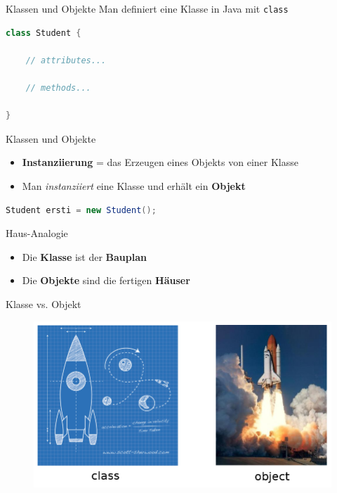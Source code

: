 \documentclass[18pt]{beamer}
\begin{document}
\begin{frame}[fragile]{Klassen und Objekte}
    Man definiert eine Klasse in Java mit \texttt{class}
    \begin{exampleblock}{}
        \begin{lstlisting}[language=Java]
class Student {

    // attributes...

    // methods...

}
        \end{lstlisting}
    \end{exampleblock}
\end{frame}

\begin{frame}[fragile]{Klassen und Objekte}
    \begin{itemize}
        \item \textbf{Instanziierung} = das Erzeugen eines Objekts von einer Klasse
        \item Man \textit{instanziiert} eine Klasse und erhält ein \textbf{Objekt}
    \end{itemize}

    \begin{exampleblock}{}
        \begin{lstlisting}[language=Java]
Student ersti = new Student();
        \end{lstlisting}
    \end{exampleblock}
\end{frame}

\begin{frame}{Haus-Analogie}
    \begin{itemize}
        \item Die \textbf{Klasse} ist der \textbf{Bauplan}
        \item Die \textbf{Objekte} sind die fertigen \textbf{Häuser}
    \end{itemize}
\end{frame}

\begin{frame}{Klasse vs. Objekt}
    \begin{figure}
        \includegraphics[scale=0.3]{img/classvsobject.png}
    \end{figure}
\end{frame}
\end{document}
